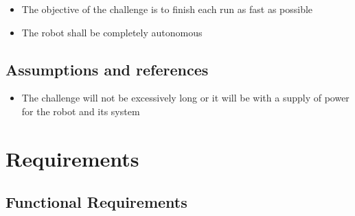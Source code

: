 \begin{itemize}
    \item The objective of the challenge is to finish each run as fast as possible
    \item The robot shall be completely autonomous
\end{itemize}

\section{Assumptions and references}

\begin{itemize}
    \item The challenge will not be excessively long or it will be with a supply of power for the robot and its system
\end{itemize}

\newpage




\chapter{Requirements}
\label{Requirements}

\section{Functional Requirements}

\def\srs#1#2#3#4#5{\item\textbf{SRS\_#1: #2}

\textit{Description}: #3

\textit{Rationale}: #4

\textit{Dependencies}: #5}


